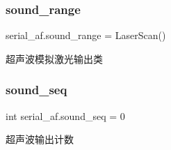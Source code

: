 \subsubsection{\texorpdfstring{sound\+\_\+range}{sound\_range}}
{\footnotesize\ttfamily serial\+\_\+af.\+sound\+\_\+range = Laser\+Scan()}



超声波模拟激光输出类 

\mbox{\label{namespaceserial__af_a48355ec276db91ffbf4665ab2c216d76}} 
\subsubsection{\texorpdfstring{sound\+\_\+seq}{sound\_seq}}
{\footnotesize\ttfamily int serial\+\_\+af.\+sound\+\_\+seq = 0}



超声波输出计数 

